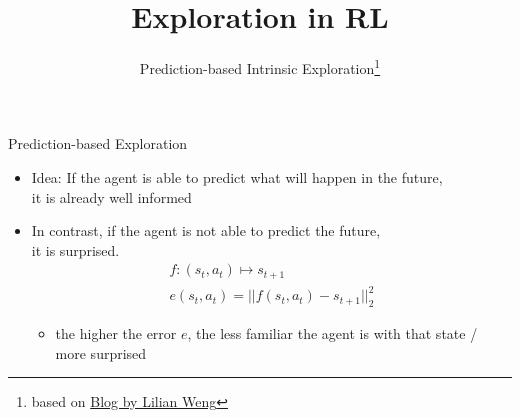 


\title[RL: Exploration]{Exploration in RL}
\subtitle{Prediction-based Intrinsic Exploration\footnote{based on \href{https://lilianweng.github.io/lil-log/2020/06/07/exploration-strategies-in-deep-reinforcement-learning.html}{Blog by Lilian Weng}}}



	
	\maketitle


\begin{frame}[c]{Prediction-based Exploration~}
	
	\begin{itemize}
		\item Idea: If the agent is able to predict what will happen in the future,\\ it is already well informed
		\item In contrast, if the agent is not able to predict the future,\\ it is surprised.
		\begin{eqnarray}
		f: (s_t, a_t) \mapsto s_{t+1} \nonumber \\
		e(s_t, a_t) = || f(s_t, a_t) - s_{t+1}||_2^2\nonumber
		\end{eqnarray}
		\begin{itemize}
			\item the higher the error $e$, the less familiar the agent is with that state / more surprised
		\end{itemize}

	\end{itemize}

	
\end{frame}
